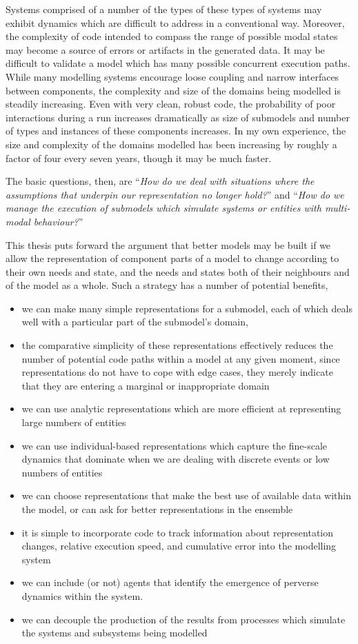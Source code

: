 Systems comprised of a number of the types of these types of systems
may exhibit dynamics which are difficult to address in a conventional
way. Moreover, the complexity of code intended to compass the range of
possible modal states may become a source of errors or artifacts in
the generated data. It may be difficult to validate a model which has
many possible concurrent execution paths. While many modelling systems
encourage loose coupling and narrow interfaces between components, the
complexity and size of the domains being modelled is steadily
increasing.  Even with very clean, robust code, the probability of
poor interactions during a run increases dramatically as size of
submodels and number of types and instances of these components
increases. In my own experience, the size and complexity of the
domains modelled has been increasing by roughly a factor of four every
seven years, though it may be much faster.

The basic questions, then, are ``\emph{How do we deal with situations 
where the assumptions that underpin our representation no longer hold?}'' 
and ``\emph{How do we manage the execution of submodels which simulate
systems or entities with multi-modal behaviour?}''

This thesis puts forward the argument that better models may be built
if we allow the representation of component parts of a model to change
according to their own needs and state, and the needs and states both
of their neighbours and of the model as a whole. Such a strategy has a
number of potential benefits,
\begin{itemize}
\item we can make many simple representations for a submodel, each of which
      deals well with a particular part of the submodel's domain,
\item the comparative simplicity of these representations effectively 
      reduces the number of potential code paths within a model at any
      given moment, since representations do not have to cope with
      edge cases, they merely indicate that they are entering a marginal
      or inappropriate domain
\item we can use analytic representations which are more efficient at
      representing large numbers of entities
\item we can use individual-based representations which capture
      the fine-scale dynamics that dominate when we are dealing with
      discrete events or low numbers of entities
\item we can choose representations that make the best use of available
      data within the model, or can ask for better representations
      in the ensemble
\item it is simple to incorporate code to track information about
      representation changes, relative execution speed, and cumulative
      error into the modelling system
\item we can include (or not) agents that identify the emergence of 
      perverse dynamics within the system.
\item we can decouple the production of the results from processes
      which simulate the systems and subsystems being modelled
\end{itemize}


